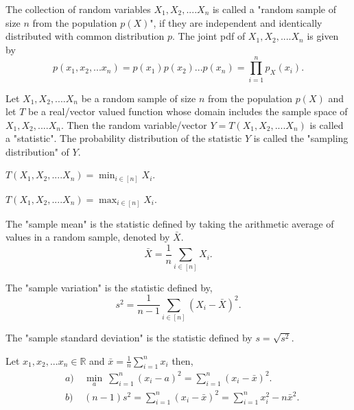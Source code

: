 \documentclass[a4paper,english,12pt]{article}
\begin{document}
\begin{defn}
The collection of random variables $X_1, X_2, .... X_n$ is called a "random sample of size $n$ from the population $p(X)$", if they are independent and identically distributed with common distribution $p$.
The joint pdf of $X_1, X_2, .... X_n$ is given by 
\begin{equation}
p(x_1,x_2,...x_n) = p(x_1) p(x_2)...p(x_n) = \prod\limits_{i=1}^{n} p_X(x_i).
\end{equation} 
\end{defn}

\begin{defn}
Let $X_1, X_2, .... X_n$ be a random sample of size $n$ from the population $p(X)$ and let $T$ be a real/vector valued function whose domain includes the sample space of $X_1, X_2, .... X_n$. Then the random variable/vector $Y = T(X_1, X_2, .... X_n)$ is called a "statistic". The probability distribution of the statistic $Y$ is called the "sampling distribution" of $Y$.
\end{defn}

\begin{exmp}
$T(X_1, X_2, .... X_n) = \min_{i \in [n]} X_i$.
\end{exmp}
\begin{exmp}
$T(X_1, X_2, .... X_n) = \max_{i \in [n]} X_i$.
\end{exmp}

\begin{defn}
The "sample mean" is the statistic defined by taking the arithmetic average of values in a random sample, denoted by $\bar{X}$.
\begin{equation}
\bar{X} = \frac{1}{n} \sum_{i \in [n]} X_i.
\end{equation}
\end{defn}

\begin{defn}
The "sample variation" is the statistic defined by, 
\begin{equation}
s^2 = \frac{1}{n-1}  \sum_{i \in [n]} (X_i - \bar{X})^2.
\end{equation}
\end{defn}

\begin{defn}
The "sample standard deviation" is the statistic defined by $s = \sqrt{s^2}$.
\end{defn}

\begin{thm}
Let $x_1, x_2,...x_n  \in \mathbb{R}$ and $\bar{x} = \frac{1}{n} \displaystyle \sum_{i=1}^{n} x_i$ then,\\
\begin{eqnarray}
&a)& ~ \min_{a} ~ \sum_{i=1}^{n} (x_i - a)^2 = \sum_{i=1}^{n} (x_i - \bar{x})^2. \\
&b)& ~ (n-1)s^2 = \sum_{i=1}^{n} (x_i - \bar{x})^2 = \sum_{i=1}^{n} x_i^2 - n\bar{x}^2.
\end{eqnarray}
\end{thm}
\end{document}
